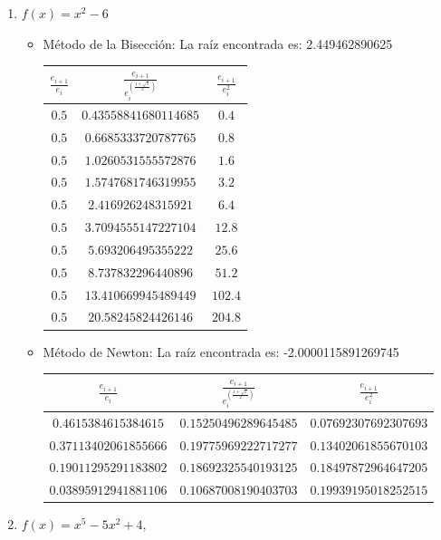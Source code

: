 \documentclass{article}
\begin{document}
\begin{enumerate}[I)]
\begin{enumerate}[(1)]
\item $f(x)=x^2-6$
\begin{itemize}
\item Método de la Bisección: La raíz encontrada es: 2.449462890625 \\
\newline
\begin{tabular}{|c|c|c|}
\hline
$\frac{e_{i+1}}{e_i}$ & $\frac{e_{i+1}}{e^{\left(\frac{1 + \sqrt{5}}{2}\right)}_i}$ & $\frac{e_{i+1}}{e^2_i}$ \\
\hline
$0.5$ & $0.43558841680114685$ & $0.4$\\
\hline 
$0.5$ & $0.6685333720787765$ & $0.8$ \\
\hline 
$0.5$ & $1.0260531555572876$ & $1.6$ \\
\hline 
$0.5$ & $1.5747681746319955$ & $3.2$ \\
\hline 
$0.5$ & $2.416926248315921$ & $6.4$ \\
\hline 
$0.5$ & $3.7094555147227104$ & $12.8$ \\
\hline 
$0.5$ & $5.693206495355222$ & $25.6$ \\
\hline 
$0.5$ & $8.737832296440896$ & $51.2$ \\
\hline
$0.5$ & $13.410669945489449$ & $102.4$ \\
\hline 
$0.5$ & $20.58245824426146$ & $204.8$ \\
\hline 
\end{tabular}
\newline
\item Método de Newton: La raíz encontrada es: -2.0000115891269745 \\
\newline
\begin{tabular}{|c|c|c|}
\hline
$\frac{e_{i+1}}{e_i}$ & $\frac{e_{i+1}}{e^{\left(\frac{1 + \sqrt{5}}{2}\right)}_i}$ & $\frac{e_{i+1}}{e^2_i}$ \\
\hline
$0.4615384615384615$ & $0.15250496289645485$ & $0.07692307692307693$\\
\hline 
$0.37113402061855666$ & $0.19775969222717277$ & $0.13402061855670103$ \\
\hline 
$0.19011295291183802$ & $0.18692325540193125$ & $0.18497872964647205$ \\
\hline 
$0.03895912941881106$ & $0.10687008190403703$ & $0.19939195018252515$ \\
\hline
\end{tabular}
\end{itemize}

\vspace{5mm}
\item $f(x)=x^5-5x^2+4,$


\end{enumerate}
\end{enumerate}
\end{document}
